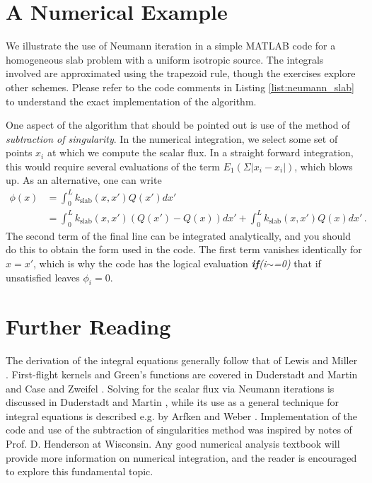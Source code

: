 \section*{A Numerical Example}

We illustrate the use of Neumann iteration in a simple MATLAB code for a homogeneous slab problem with a uniform isotropic source.  The integrals involved are approximated using the trapezoid rule, though the exercises explore other schemes.  Please refer to the code comments in Listing \ref{list:neumann_slab} to understand the exact implementation of the algorithm.

One aspect of the algorithm that should be pointed out is use of the method of \textit{subtraction of singularity}.  In the numerical integration, we select some set of points $x_i$ at which we compute the scalar flux.  In a straight forward integration, this would require several evaluations of the term $E_1(\Sigma|x_i-x_i|)$, which blows up.  As an alternative, one can write
\begin{equation}
\begin{split}
  \phi(x) &= \int^L_0 k_{\text{slab}}(x,x') Q(x')dx' \\
          &= \int^L_0 k_{\text{slab}}(x,x') (Q(x')-Q(x))dx' +  \int^L_0 k_{\text{slab}}(x,x') Q(x)dx'  \, .
\end{split}
\end{equation}
The second term of the final line can be integrated analytically, and you should do this to obtain the form used in the code.  The first term vanishes identically for $x=x'$, which is why the code has the logical evaluation \textsl{\textbf{if}(i$\sim$=0)} that if unsatisfied leaves $\phi_i = 0$.


\lstset{language=Octave,caption=Solution of Slab Problem via Neumann Series, label=list:neumann_slab}


\section*{Further Reading}

The derivation of the integral equations generally follow that of Lewis and Miller \cite{lewis1993cmn}.  First-flight kernels and Green's functions are covered in Duderstadt and Martin \cite{duderstadt1976tt} and Case and Zweifel \cite{case1967ltt}.  Solving for the scalar flux via Neumann iterations is discussed in Duderstadt and Martin \cite{duderstadt1976tt}, while its use as a general technique for integral equations is described e.g. by Arfken and Weber \cite{arfken1995mmp}.  Implementation of the code and use of the subtraction of singularities method was inspired by notes of Prof. D. Henderson at Wisconsin. Any good numerical analysis textbook will provide more information on numerical integration, and the reader is encouraged to explore this fundamental topic.    


